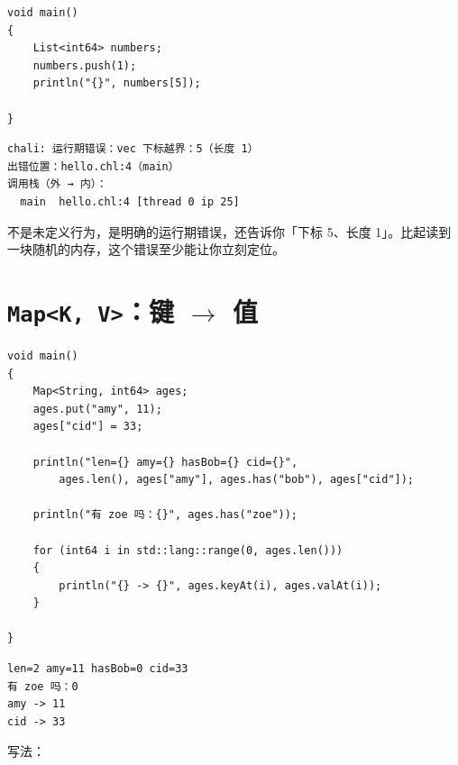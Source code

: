 \par
\medskip
\begin{lstlisting}[style=chali]
void main()
{
    List<int64> numbers;
    numbers.push(1);
    println("{}", numbers[5]);

}
\end{lstlisting}
\par
\medskip

\par
\medskip
\begin{lstlisting}[style=out]
chali: 运行期错误：vec 下标越界：5（长度 1）
出错位置：hello.chl:4（main）
调用栈（外 → 内）：
  main  hello.chl:4 [thread 0 ip 25]
\end{lstlisting}
\par
\medskip

不是未定义行为，是明确的运行期错误，还告诉你「下标 5、长度 1」。比起读到一块随机的内存，这个错误至少能让你立刻定位。

\section{\texttt{Map<\allowbreak{}K,\allowbreak{} V>\allowbreak{}}：键 \ensuremath{\rightarrow} 值}

\par
\medskip
\begin{lstlisting}[style=chali]
void main()
{
    Map<String, int64> ages;
    ages.put("amy", 11);
    ages["cid"] = 33;

    println("len={} amy={} hasBob={} cid={}",
        ages.len(), ages["amy"], ages.has("bob"), ages["cid"]);

    println("有 zoe 吗：{}", ages.has("zoe"));

    for (int64 i in std::lang::range(0, ages.len()))
    {
        println("{} -> {}", ages.keyAt(i), ages.valAt(i));
    }

}
\end{lstlisting}
\par
\medskip

\par
\medskip
\begin{lstlisting}[style=out]
len=2 amy=11 hasBob=0 cid=33
有 zoe 吗：0
amy -> 11
cid -> 33
\end{lstlisting}
\par
\medskip

写法：

